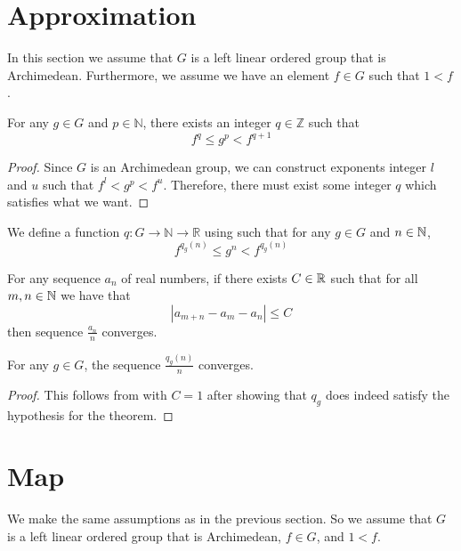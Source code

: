 \section{Approximation}
In this section we assume that $G$ is a left linear ordered group
that is Archimedean. Furthermore, we assume we have an element $f\in G$
such that $1 < f$.
\begin{theorem}\label{approximate}
    \leanok
    For any $g \in G$ and $p \in \mathbb{N}$,
    there exists an integer $q \in \mathbb{Z}$
    such that
    \[
        f^q \le g^p < f^{q+1}
    \]
\end{theorem}
\begin{proof}\leanok
Since $G$ is an Archimedean group, we can construct exponents integer $l$ and $u$
such that $f^l < g^p < f^u$. Therefore, there must exist some integer $q$
which satisfies what we want.
\end{proof}

\begin{definition}\label{def:q}
    \leanok{}
    We define a function $q \colon G \to \mathbb{N} \to \mathbb{R}$
    using  such that for any $g\in G$ and $n \in \mathbb{N}$,
    \[
        f^{q_g(n)} \le g^n < f^{q_g(n)}
    \]
\end{definition}

\begin{theorem}\label{sequence_convergence}
    \leanok
    For any sequence $a_n$ of real numbers,
    if there exists $C \in \mathbb{R}$ such that for all $m,n\in \mathbb{N}$
    we have that
    \[
        |a_{m+n} - a_m - a_n| \le C
    \]
    then sequence $\frac{a_n}{n}$ converges.
\end{theorem}

\begin{theorem}\label{q_convergence}
    \leanok{}
    For any $g \in G$, the sequence $\frac{q_g(n)}{n}$ converges.
\end{theorem}
\begin{proof}\leanok
This follows from  with $C = 1$ after
showing that $q_g$ does indeed satisfy the hypothesis
for the theorem.
\end{proof}

\section{Map}
We make the same assumptions as in the previous section.
So we assume that $G$ is a left linear ordered group
that is Archimedean, $f\in G$, and $1 < f$.

